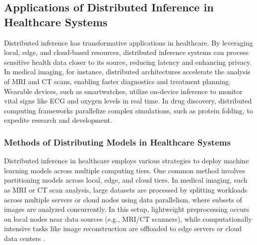 \documentclass[conference]{IEEEtran}
\begin{document}


\subsection{Applications of Distributed Inference in Healthcare Systems}

Distributed inference has transformative applications in healthcare. By leveraging local, edge, and cloud-based resources, distributed inference systems can process sensitive health data closer to its source, reducing latency and enhancing privacy. In medical imaging, for instance, distributed architectures accelerate the analysis of MRI and CT scans, enabling faster diagnostics and treatment planning. Wearable devices, such as smartwatches, utilize on-device inference to monitor vital signs like ECG and oxygen levels in real time. In drug discovery, distributed computing frameworks parallelize complex simulations, such as protein folding, to expedite research and development.

\subsubsection{Methods of Distributing Models in Healthcare Systems}

Distributed inference in healthcare employs various strategies to deploy machine learning models across multiple computing tiers. One common method involves partitioning models across local, edge, and cloud tiers. In medical imaging, such as MRI or CT scan analysis, large datasets are processed by splitting workloads across multiple servers or cloud nodes using data parallelism, where subsets of images are analyzed concurrently. In this setup, lightweight preprocessing occurs on local nodes near data sources (e.g., MRI/CT scanners), while computationally intensive tasks like image reconstruction are offloaded to edge servers or cloud data centers \cite{akdemir2025technical}. 
\end{document}
